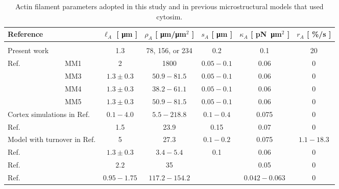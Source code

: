 \begin{sidewaystable}
	\begin{minipage}[c][\textheight][c]{\textwidth}

		\begin{center}
			\begin{tabular}{lcccccc} \multicolumn{2}{l}{\textbf{Reference}} & $\ell_A$ \textbf{[ }\si{\micro\meter}\textbf{ ]} & $\rho_A$ \textbf{[ }\si{\micro\meter/\micro\meter}$^{2}$\textbf{ ]} & $s_A$ \textbf{[ }\si{\micro\meter}\textbf{ ]} & $\kappa_A$ \textbf{[ }\si{\pico\newton \micro\meter}$^{2}$\textbf{ ]} & $r_A$ \textbf{[ }\si{\%/\second}\textbf{ ]} \\ \hline \\
				
				\multicolumn{2}{l}{Present work}  & 1.3 & 78, 156, or 234 & 0.2 & 0.1 & 20  \\
				
				\multirow{4}{*}{Ref. \cite{Cortes2020}} & MM1 & 2 & 1800 & $0.05 - 0.1$ & 0.06 & 0 \\
				
				& MM3 & $1.3 \pm 0.3$ & $50.9 - 81.5$ & $0.05 - 0.1$ & 0.06 & 0 \\
				
				& MM4 & $1.3 \pm 0.3$ &  $38.2 - 61.1$ & $0.05 - 0.1$ & 0.06 & 0 \\
				
				& MM5 & $1.3 \pm 0.3$ &  $50.9 - 81.5$ & $0.05 - 0.1$ & 0.06 & 0 \\
				
				\multicolumn{2}{l}{Cortex simulations in Ref. \cite{Wollrab2019}} & $0.1 - 4.0$ & $5.5 - 218.8$ & $0.1 - 0.4$ & 0.075 & 0 \\
				
				\multicolumn{2}{l}{Ref. \cite{Bun2018}} & 1.5 & 23.9 & 0.15 & 0.07 & 0  \\
				
				\multicolumn{2}{l}{Model with turnover in Ref. \cite{Belmonte2017}} & 5 & 27.3 & $0.1 - 0.2$ & 0.075 & $1.1 - 18.3$ \\
				
				\multicolumn{2}{l}{Ref. \cite{Descovich2017}} & $1.3 \pm 0.3$ & $3.4 - 5.4$ & 0.1 & 0.06 & 0 \\
				
				\multicolumn{2}{l}{Ref. \cite{Ding2017}} & $2.2$ & 35 & \textemdash & 0.05 & 0 \\
				
				\multicolumn{2}{l}{Ref. \cite{Ennomani2016}} & $0.95 - 1.75$ & $117.2 - 154.2$ & \textemdash & $0.042 - 0.063$ & 0 \\
				
			\end{tabular}
		\end{center}
			\caption{Actin filament parameters adopted in this study and in previous microstructural models that used cytosim.}
		\label{tab:ActinParamTable}
	\end{minipage}
\end{sidewaystable}

